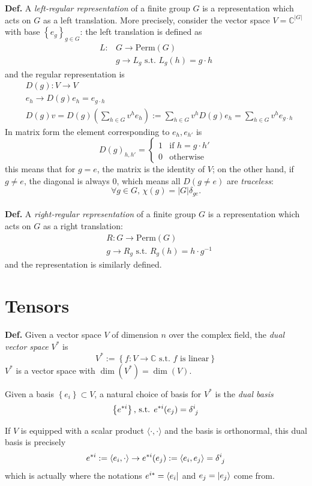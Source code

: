 \textbf{Def.} A \textit{left-regular representation} of a finite group
$G$ is a representation which acts on $G$ as a left translation. More
precisely, consider the vector space $V=\mathbb{C}^{|G|}$ with base
$\left\{e_g\right\}_{g\in G}$: the left translation is defined as
\begin{align*}
    L:&G\to\text{Perm}(G)\\
      &g\to L_g\text{ s.t. }L_g(h)=g\cdot h
\end{align*}
and the regular representation is
\begin{align*}
&D(g):V\to V\\
&e_h\to D(g)e_h=e_{g\cdot h}\\
&D\left(g\right)v = D(g)\left(\sum_{h\in G}^{}v^he_h\right):=\sum_{h\in G}
v^hD(g)e_h = \sum_{h\in G}^{}v^h e_{g\cdot h}
\end{align*}
In matrix form the element corresponding to $e_h,e_{h'}$ is
$$D(g)_{h,h'}=\begin{cases}
    1&\text{if }h=g\cdot h'\\
    0&\text{otherwise}
\end{cases}
$$
this means that for $g=e$, the matrix is the identity of $V$; on the other hand,
if $g\neq e$, the diagonal is always $0$, which means all $D(g\neq e)$ are 
\textit{traceless}:
$$\forall g\in G,\, \chi(g)=|G|\delta_{ge}.$$\\

\textbf{Def.} A \textit{right-regular representation} of a finite group $G$ is a
representation which acts on $G$ as a right translation:
\begin{align}
&R:G\to\text{Perm}(G)\\
& g\to R_g\text{ s.t. } R_g(h)=h\cdot g^{-1}
\end{align}
and the representation is similarly defined.

\section{Tensors}
\textbf{Def.} Given a vector space $V$ of dimension $n$ over the complex field,
the \textit{dual vector space} $V^*$ is
$$V^*:=\left\{f:V\to\mathbb{C}\text{ s.t. $f$ is linear}\right\}$$
$V^*$ is a vector space with $\dim(V^*)=\dim(V)$.

Given a basis $\left\{e_i\right\}\subset V$, a natural choice of basis for 
$V^*$ is the \textit{dual basis}
$$\left\{e^{*i}\right\}\text{, s.t. }e^{*i}(e_j)=\delta\indices{^i_j}$$

If $V$ is equipped with a scalar product $\langle{\cdot},{\cdot}\rangle$ and the
basis is orthonormal, this dual basis is precisely
$$e^{*i}:=\langle e_i,\cdot\rangle\to e^{*i}(e_j):=\langle e_i,e_j\rangle =
\delta\indices{^i_j}$$
which is actually where the notations $e^{i*}=\bra{e_i}$ and $e_j=\ket{e_j}$
come from.
